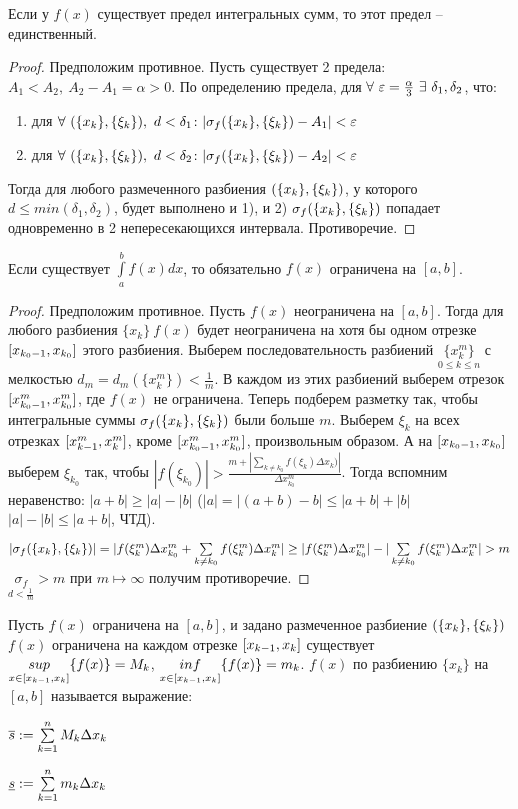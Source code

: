 \begin{theor}
Если у $f(x)$ существует предел интегральных сумм, то этот предел -- единственный.
\end{theor}
\begin{proof}
Предположим противное. Пусть существует 2 предела: $A_1<A_2,\ A_2-A_1=\alpha>0$.
По определению предела, для $\forall\ \eps=\frac\alpha3\ \exists\ \delta_1,\delta_2$, что:
\begin{enumerate}
\item для $\forall\ \rr,\ d<\delta_1\colon|\sigma_f\rr-A_1|<\eps$
\item для $\forall\ \rr,\ d<\delta_2\colon|\sigma_f\rr-A_2|<\eps$
\end{enumerate}
Тогда для любого размеченного разбиения $(\{x_k\},\{\xi_k\})$, у которого $d\leq min(\delta_1,\delta_2)$, будет выполнено и 1), и 2) \then $\sigma_f(\{x_k\},\{\xi_k\})$ попадает одновременно в 2 непересекающихся интервала. Противоречие.
\end{proof}
\begin{theor}
Если существует $\int\limits_a^bf(x)dx$, то обязательно $f(x)$ ограничена на $[a,b]$.
\end{theor}
\begin{proof}
Предположим противное. Пусть $f(x)$ неограничена на $[a,b]$. Тогда для любого разбиения $\{x_k\}\ f(x)$ будет неограничена на хотя бы одном отрезке $[x_{k_0-1},x_{k_0}]$ этого разбиения. Выберем последовательность разбиений $\underset{0\leq k\leq n}{\{x_k^m\}}$ с мелкостью $d_m=d_m(\{x_k^m\})<\frac1m$. В каждом из этих разбиений выберем отрезок $[x^m_{k_0-1},x^m_{k_0}]$, где $f(x)$ не ограничена. Теперь подберем разметку так, чтобы интегральные суммы $\sigma_f(\{x_k\},\{\xi_k\})$ были больше $m$. Выберем $\xi_k$ на всех отрезках $[x^m_{k-1},x^m_k]$, кроме $[x^m_{k_0-1},x^m_{k_0}]$, произвольным образом. А на $[x_{k_0-1},x_{k_0}]$ выберем $\xi_{k_0}$ так, чтобы $|f(\xi_{k_0})|>\frac{m+|\sum\limits_{k\neq k_0}f(\xi_k)\Delta x_k)|}{\Delta x^m_{k_0}}$.
Тогда вспомним неравенство: $|a+b|\geq|a|-|b|$ ($|a|=|(a+b)-b|\leq|a+b|+|b|$ \then $|a|-|b|\leq|a+b|$, ЧТД).

$|\sigma_f\rr|=|f(\xi_k^m)\Delta x_{k_0}^m+\sum\limits_{k\neq k_0}f(\xi^m_k)\Delta x^m_k|\geq|f(\xi_k^m)\Delta x_{k_0}^m|-|\sum\limits_{k\neq k_0}f(\xi^m_k)\Delta x^m_k|>m$ \then $\underset{d<\frac1m}{\sigma_f}>m$ \then при $m\mapsto\infty$ получим противоречие.
\end{proof}
\begin{opred}
Пусть $f(x)$ ограничена на $[a,b]$, и задано размеченное разбиение $(\{x_k\},\{\xi_k\})$ \then $f(x)$ ограничена на каждом отрезке $[x_{k-1},x_k]$ \then  существует $\underset{x\in[x_{k-1},x_k]}{sup}\{f(x)\}=M_k$, $\underset{x\in[x_{k-1},x_k]}{inf}\{f(x)\}=m_k$.  $f(x)$ по разбиению $\{x_k\}$ на $[a,b]$  называется выражение:

$\overline{s}:=\sum\limits_{k=1}^nM_k\Delta x_k$

$\underline{s}:=\sum\limits_{k=1}^nm_k\Delta x_k$
\end{opred}
